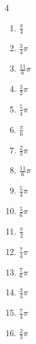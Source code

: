 \begin{multicols}{4}
\begin{enumerate}
  \item $\displaystyle \frac{\pi}{4}$

  \item $\displaystyle \frac{3}{4}\pi$

  \item $\displaystyle \frac{11}{6}\pi$

  \item $\displaystyle \frac{3}{2}\pi$

  \item $\displaystyle \frac{5}{4}\pi$

  \item $\displaystyle \frac{\pi}{6}$

  \item $\displaystyle \frac{2}{3}\pi$

  \item $\displaystyle \frac{11}{6}\pi$

  \item $\displaystyle \frac{5}{4}\pi$

  \item $\displaystyle \frac{5}{6}\pi$

  \item $\displaystyle \frac{\pi}{2}$

  \item $\displaystyle \frac{7}{4}\pi$

  \item $\displaystyle \frac{7}{6}\pi$

  \item $\displaystyle \frac{3}{4}\pi$

  \item $\displaystyle \frac{7}{4}\pi$

  \item $\displaystyle \frac{2}{3}\pi$


\end{enumerate}
\end{multicols}
